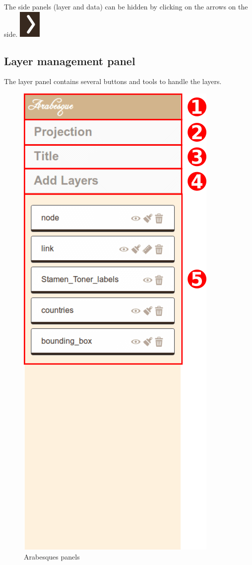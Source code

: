 \documentclass[]{book}
\begin{document}
The side panels (layer and data) can be hidden by clicking on the arrows on the side. \includegraphics{images/functions/00_panels_arrow.png}

\hypertarget{layer-management-panel}{%
\subsection{Layer management panel}\label{layer-management-panel}}

The layer panel contains several buttons and tools to handle the layers.

\begin{figure}
\centering
\includegraphics{images/functions/04_functions_swiss_example_layer_panel.png}
\caption{Arabesques panels}
\end{figure}
\end{document}
